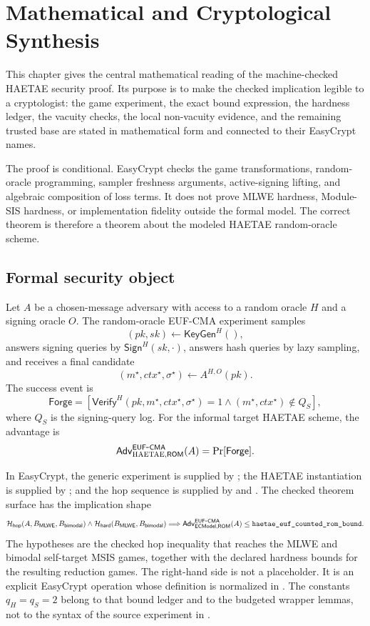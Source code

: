 \chapter{Mathematical and Cryptological Synthesis}
\label{ch:mathematical-cryptological-synthesis}

This chapter gives the central mathematical reading of the machine-checked
HAETAE security proof.  Its purpose is to make the checked implication legible to a
cryptologist: the game experiment, the exact bound expression, the hardness
ledger, the vacuity checks, the local non-vacuity evidence, and the remaining
trusted base are stated in mathematical form and connected to their EasyCrypt
names.

The proof is conditional.  EasyCrypt checks the game transformations,
random-oracle programming, sampler freshness arguments, active-signing lifting,
and algebraic composition of loss terms.  It does not prove MLWE hardness,
Module-SIS hardness, or implementation fidelity outside the formal model.  The
correct theorem is therefore a theorem about the modeled HAETAE random-oracle
scheme.

\section{Formal security object}
\label{sec:synthesis-formal-object-final}

Let \(A\) be a chosen-message adversary with access to a random oracle \(H\) and
a signing oracle \(O\).  The random-oracle EUF-CMA experiment samples
\[
  (pk,sk) \leftarrow \mathsf{KeyGen}^{H}(),
\]
answers signing queries by \(\mathsf{Sign}^{H}(sk,\cdot)\), answers hash queries
by lazy sampling, and receives a final candidate
\[
  (m^\star,ctx^\star,\sigma^\star)\leftarrow A^{H,O}(pk).
\]
The success event is
\[
  \mathsf{Forge}
  =
  \left[
    \mathsf{Verify}^{H}(pk,m^\star,ctx^\star,\sigma^\star)=1
    \wedge
    (m^\star,ctx^\star)\notin Q_S
  \right],
\]
where \(Q_S\) is the signing-query log.  For the informal target HAETAE scheme,
the advantage is
\[
  \mathsf{Adv}_{\textsc{HAETAE},\mathsf{ROM}}^{\mathsf{EUF}\mbox{-}\mathsf{CMA}}(A)=\Pr[\mathsf{Forge}].
\]

In EasyCrypt, the generic experiment is supplied by ; the
HAETAE instantiation is supplied by ; and the hop sequence
is supplied by  and .  The
checked theorem surface has the implication shape
\[
  \mathcal{H}_{\mathsf{hop}}(A,B_{\mathsf{MLWE}},B_{\mathsf{bimodal}})
  \wedge
  \mathcal{H}_{\mathsf{hard}}(B_{\mathsf{MLWE}},B_{\mathsf{bimodal}})
  \Longrightarrow
  \mathsf{Adv}_{\mathsf{ECModel},\mathsf{ROM}}^{\mathsf{EUF}\mbox{-}\mathsf{CMA}}(A)
  \le
  \texttt{haetae\_euf\_counted\_rom\_bound}.
\]
The hypotheses are the checked hop inequality that reaches the MLWE and bimodal
self-target MSIS games, together with the declared hardness bounds for the
resulting reduction games.  The right-hand side is not a placeholder.  It is an
explicit EasyCrypt operation whose definition is normalized in
.  The constants \(q_H=q_S=2\) belong to that bound
ledger and to the budgeted wrapper lemmas, not to the syntax of the source
\eufcma{} experiment in .

